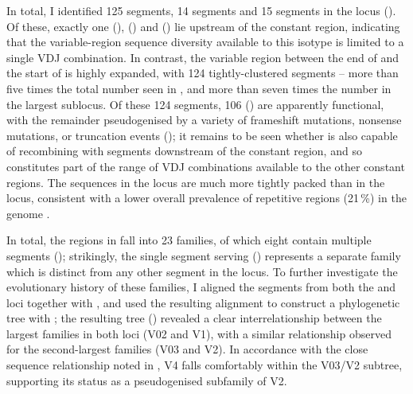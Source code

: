 In total, I identified 125 \vh segments, 14 \dh segments and 15 \jh segments in the \Xma \igh{} locus (). Of these, exactly one \vh (), \dh () and \jh () lie upstream of the  constant region, indicating that the variable-region sequence diversity available to this isotype is limited to a single VDJ combination. In contrast, the variable region between the end of  and the start of  is highly expanded, with 124 tightly-clustered \vh segments -- more than five times the total number seen in \Nfu, and more than seven times the number in the largest \Nfu sublocus. Of these 124 \vh segments, 106 () are apparently functional, with the remainder pseudogenised by a variety of frameshift mutations, nonsense mutations, or truncation events (); it remains to be seen whether  is also capable of recombining with \dh segments downstream of the  constant region, and so constitutes part of the range of VDJ combinations available to the other constant regions. The \vh sequences in the \Xma locus are much more tightly packed than in the \Nfu locus, consistent with a lower overall prevalence of repetitive regions (21\,\%) in the \Xma genome \parencite{yuan2018repeats}.
	
In total, the \vh regions in \Xma \igh{} fall into 23 families, of which eight contain multiple segments (); strikingly, the single \vh segment serving  () represents a separate family which is distinct from any other segment in the locus. To further investigate the evolutionary history of these families, I aligned the \vh segments from both the \Xma and \Nfu \igh{} loci together with , and used the resulting alignment to construct a phylogenetic tree with  \parencite{stamatakis2014raxml8,stamatakis2005raxml3,stamatakis2006raxml6}; the resulting tree () revealed a clear interrelationship between the largest families in both loci (\Xma V02 and \Nfu V1), with a similar relationship observed for the second-largest families (\Xma V03 and \Nfu V2). 
In accordance with the close sequence relationship noted in , \Nfu V4 falls comfortably within the V03/V2 subtree, supporting its status as a pseudogenised subfamily of \Nfu V2.
		
